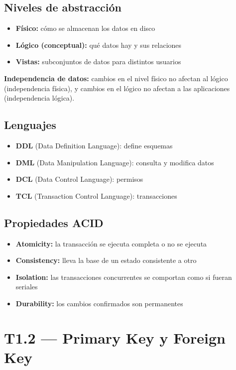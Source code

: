 \documentclass[12pt, a4paper]{article}
\begin{document}
\subsection{Niveles de abstracción}
\begin{itemize}
  \item \textbf{Físico:} cómo se almacenan los datos en disco
  \item \textbf{Lógico (conceptual):} qué datos hay y sus relaciones
  \item \textbf{Vistas:} subconjuntos de datos para distintos usuarios
\end{itemize}

\textbf{Independencia de datos:} cambios en el nivel físico no afectan al lógico (independencia física), y cambios en el lógico no afectan a las aplicaciones (independencia lógica).

\subsection{Lenguajes}
\begin{itemize}
  \item \textbf{DDL} (Data Definition Language): define esquemas
  \item \textbf{DML} (Data Manipulation Language): consulta y modifica datos
  \item \textbf{DCL} (Data Control Language): permisos
  \item \textbf{TCL} (Transaction Control Language): transacciones
\end{itemize}

\subsection{Propiedades ACID}
\begin{itemize}
  \item \textbf{Atomicity:} la transacción se ejecuta completa o no se ejecuta
  \item \textbf{Consistency:} lleva la base de un estado consistente a otro
  \item \textbf{Isolation:} las transacciones concurrentes se comportan como si fueran seriales
  \item \textbf{Durability:} los cambios confirmados son permanentes
\end{itemize}

\section{T1.2 — Primary Key y Foreign Key}
\end{document}
